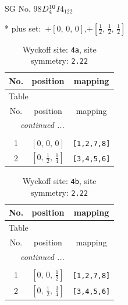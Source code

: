 \documentclass[fleqn,8pt]{jsarticle}
\begin{document}
\setcounter{MaxMatrixCols}{32}

\renewcommand{\tablename}{Table~}
\renewcommand{\figurename}{Figure~}
\begin{center}
\LARGE
SG No. 98\quad$D_{\rm 4}^{10}$\quad$I4_122$\quad[ tetragonal ]
\end{center}
* plus set:\,\,\,$+\left[ 0,\, 0,\, 0 \right]$,\quad $+\left[ \frac{1}{2},\, \frac{1}{2},\, \frac{1}{2} \right]$
\renewcommand{\arraystretch}{1.2}
\begin{longtable}{ccc}
\caption{Wyckoff site: {\tt 4a}, site symmetry: {\tt 2.22}}
 \\
 \hline \hline
No. & position & mapping \\ \hline \endfirsthead

\multicolumn{2}{l}{\tablename\ \thetable{}} \\
 \hline \hline
No. & position & mapping \\ \hline \endhead

 \hline \hline
\multicolumn{2}{r}{\footnotesize\it continued ...} \\ \endfoot

 \hline \hline
\multicolumn{2}{r}{} \\ \endlastfoot

1 & $\left[ 0,\, 0,\, 0 \right]$ & {\tt [1,2,7,8]} \\ \hline
2 & $\left[ 0,\, \frac{1}{2},\, \frac{1}{4} \right]$ & {\tt [3,4,5,6]} \\
\end{longtable}
\renewcommand{\arraystretch}{1.2}
\begin{longtable}{ccc}
\caption{Wyckoff site: {\tt 4b}, site symmetry: {\tt 2.22}}
 \\
 \hline \hline
No. & position & mapping \\ \hline \endfirsthead

\multicolumn{2}{l}{\tablename\ \thetable{}} \\
 \hline \hline
No. & position & mapping \\ \hline \endhead

 \hline \hline
\multicolumn{2}{r}{\footnotesize\it continued ...} \\ \endfoot

 \hline \hline
\multicolumn{2}{r}{} \\ \endlastfoot

1 & $\left[ 0,\, 0,\, \frac{1}{2} \right]$ & {\tt [1,2,7,8]} \\ \hline
2 & $\left[ 0,\, \frac{1}{2},\, \frac{3}{4} \right]$ & {\tt [3,4,5,6]} \\
\end{longtable}
\end{document}
